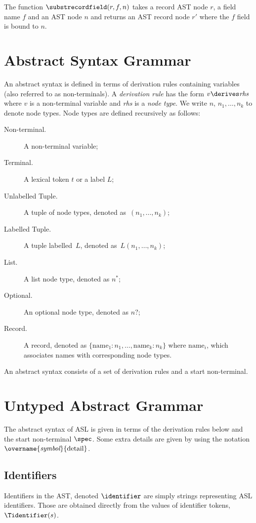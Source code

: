 \hypertarget{def-substrecordfield}{}
The function $\substrecordfield(r, f, n)$ takes a record AST node $r$, a field name $f$ and an AST node $n$
and returns an AST record node $r'$ where the $f$ field is bound to $n$.

\section{Abstract Syntax Grammar\label{sec:AbstractSyntaxGrammar}}

An abstract syntax is defined in terms of derivation rules containing variables (also referred to as non-terminals).
%
A \emph{derivation rule} has the form $v \derives \textit{rhs}$ where $v$ is a non-terminal variable and \textit{rhs} is a \emph{node type}. We write $n$, $n_1,\ldots,n_k$ to denote node types.
%
Node types are defined recursively as follows:
\begin{description}
\item[Non-terminal.] A non-terminal variable;
\item[Terminal.] A lexical token $t$ or a label $L$;
\item[Unlabelled Tuple.] A tuple of node types, denoted as~$(n_1,\ldots,n_k)$;
\item[Labelled Tuple.] A tuple labelled~$L$, denoted as~$L(n_1,\ldots,n_k)$;
\item[List.] A list node type, denoted as $n^{*}$;
\item[Optional.] An optional node type, denoted as $n?$;
\item[Record.] A record, denoted as $\{\text{name}_1 : n_1,\ldots,\text{name}_k : n_k\}$ where $\text{name}_i$, which associates names with corresponding node types.
\end{description}

\newpage

An abstract syntax consists of a set of derivation rules and a start non-terminal.

\section{Untyped Abstract Grammar\label{sec:UntypedAbstractGrammar}}

The abstract syntax of ASL is given in terms of the derivation rules below and the start non-terminal $\spec$.
%
Some extra details are given by using the notation $\overname{\textit{symbol}}{\text{detail}}$.

\subsection{Identifiers \label{sec:Identifiers}}
\hypertarget{ast-identifier}{}
Identifiers in the AST, denoted $\identifier$ are simply strings representing ASL identifiers.
Those are obtained directly from the values of identifier tokens, $\Tidentifier(s)$.

